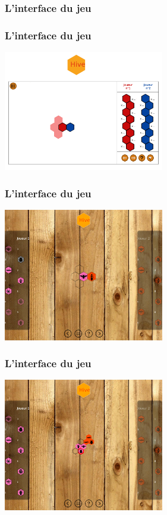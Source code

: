 \documentclass{beamer}
\begin{document}
\begin{frame}
    \frametitle{L'interface du jeu}
\end{frame}
\begin{frame}
    \frametitle{L'interface du jeu}
    \begin{center}
    \includegraphics[width=7cm]{jeuv1.png}
    \end{center}
\end{frame}
\begin{frame}
    \frametitle{L'interface du jeu}
    \begin{center}
    \includegraphics[width=7cm]{jeu.png}
    \end{center}
\end{frame}
\begin{frame}
    \frametitle{L'interface du jeu}
    \begin{center}
    \includegraphics[width=7cm]{deplCloporte.png}
    \end{center}
\end{frame}
\end{document}
